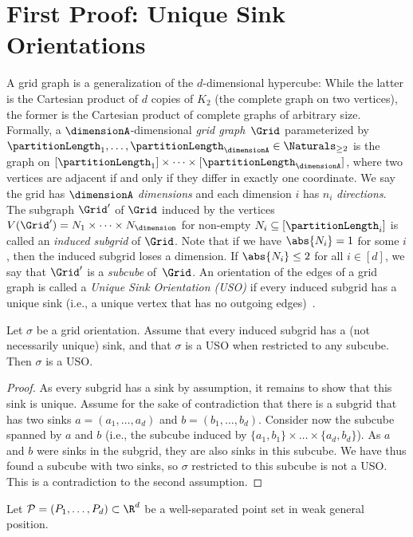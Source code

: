 \section{First Proof: Unique Sink Orientations}
\label{sec:uso_proof}
%
A grid graph is a generalization of the $d$-dimensional hypercube: 
While the latter is the Cartesian product of $d$ copies of $K_2$ (the complete graph on two vertices), the former is the Cartesian product of complete graphs of arbitrary size.
Formally, a $\dimensionA$-dimensional \emph{grid graph}~$\Grid$ parameterized by $\partitionLength_1, \dots, \partitionLength_\dimensionA \in \Naturals_{\geq 2}$ is the graph on $[\partitionLength_1] \times \dots \times [\partitionLength_\dimensionA]$, where two vertices are adjacent if and only if they differ in exactly one coordinate.
We say the grid has $\dimensionA$ \emph{dimensions} and each dimension $i$ has $n_i$ \emph{directions}.
%
The subgraph $\Grid'$ of $\Grid$ induced by the vertices $V(\Grid') = N_1 \times \dots \times N_\dimension$ for non-empty $N_i \subseteq [\partitionLength_i]$ 
is called an \emph{induced subgrid} of $\Grid$.
Note that if we have $\abs{N_i}=1$ for some $i$, then the induced subgrid loses a dimension.
If $\abs{N_i} \leq 2$ for all $i \in [d]$, we say that $\Grid'$ is a \emph{subcube} of~$\Grid$.
An orientation of the edges of a grid graph is called a \emph{Unique Sink Orientation (USO)} if every induced subgrid has a unique sink (i.e., a unique vertex that has no outgoing edges)~\cite{gaertner2008grids}.
%
%
\begin{lemma}\label{lem:GridUSO}
Let $\sigma$ be a grid orientation. Assume that every induced subgrid has a (not necessarily unique) sink, and that $\sigma$ is a USO when restricted to any subcube. Then $\sigma$ is a USO.
\end{lemma}
%
\begin{proof}
As every subgrid has a sink by assumption, it remains to show that this sink is unique. Assume for the sake of contradiction that there is a subgrid that has two sinks $a=(a_1,\ldots,a_d)$ and $b=(b_1,\ldots,b_d)$. 
%
Consider now the subcube spanned by $a$ and $b$ (i.e., the subcube induced by $\{a_1, b_1\} \times \dots \times \{a_d, b_d\}$). As $a$ and $b$ were sinks in the subgrid, they are also sinks in this subcube. We have thus found a subcube with two sinks, so $\sigma$ restricted to this subcube is not a USO. This is a contradiction to the second assumption.
\end{proof}
%
Let $\mathcal{P} = (P_1, \dots, P_d) \subset \R^d$ be a well-separated point set in weak general position.
